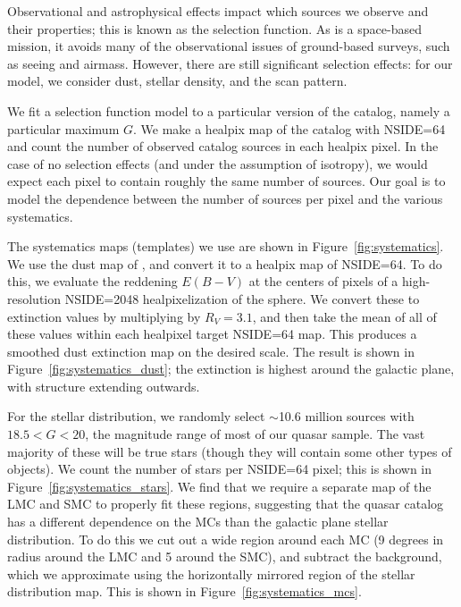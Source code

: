 Observational and astrophysical effects impact which sources we observe and their properties; this is known as the selection function. 
As \Gaia is a space-based mission, it avoids many of the observational issues of ground-based surveys, such as seeing and airmass.
However, there are still significant selection effects: for our model, we consider dust, stellar density, and the \Gaia scan pattern.

We fit a selection function model to a particular version of the catalog, namely a particular maximum $G$.
We make a healpix map of the catalog with NSIDE=64 and count the number of observed catalog sources in each healpix pixel.
In the case of no selection effects (and under the assumption of isotropy), we would expect each pixel to contain roughly the same number of sources.
Our goal is to model the dependence between the number of sources per pixel and the various systematics.

The systematics maps (templates) we use are shown in Figure~\ref{fig:systematics}. 
We use the dust map of \cite{schlafly_measuring_2011}, and convert it to a healpix map of NSIDE=64.
To do this, we evaluate the reddening $E(B-V)$ at the centers of pixels of a high-resolution NSIDE=2048 healpixelization of the sphere.
We convert these to extinction values by multiplying by $R_V=3.1$, and then take the mean of all of these values within each healpixel target NSIDE=64 map.
This produces a smoothed dust extinction map on the desired scale.
The result is shown in Figure~\ref{fig:systematics_dust}; the extinction is highest around the galactic plane, with structure extending outwards.

For the stellar distribution, we randomly select $\sim$10.6 million \Gaia sources with $18.5<G<20$, the magnitude range of most of our quasar sample.
The vast majority of these will be true stars (though they will contain some other types of objects).
We count the number of stars per NSIDE=64 pixel; this is shown in Figure~\ref{fig:systematics_stars}.
We find that we require a separate map of the LMC and SMC to properly fit these regions, suggesting that the quasar catalog has a different dependence on the MCs than the galactic plane stellar distribution.
To do this we cut out a wide region around each MC (9 degrees in radius around the LMC and 5 around the SMC), and subtract the background, which we approximate using the horizontally mirrored region of the stellar distribution map.
This is shown in Figure~\ref{fig:systematics_mcs}.


